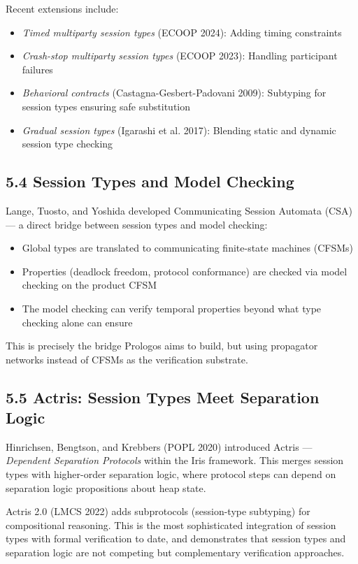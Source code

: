 \documentclass[11pt]{article}
\begin{document}
Recent extensions include:
\begin{itemize}
\item \emph{Timed multiparty session types} (ECOOP 2024): Adding timing constraints
\item \emph{Crash-stop multiparty session types} (ECOOP 2023): Handling participant
failures
\item \emph{Behavioral contracts} (Castagna-Gesbert-Padovani 2009): Subtyping for
session types ensuring safe substitution
\item \emph{Gradual session types} (Igarashi et al. 2017): Blending static and
dynamic session type checking
\end{itemize}
\subsection{5.4 Session Types and Model Checking}
\label{sec:org0774c5a}

Lange, Tuosto, and Yoshida developed Communicating Session Automata (CSA) ---
a direct bridge between session types and model checking:

\begin{itemize}
\item Global types are translated to communicating finite-state machines (CFSMs)
\item Properties (deadlock freedom, protocol conformance) are checked via model
checking on the product CFSM
\item The model checking can verify temporal properties beyond what type checking
alone can ensure
\end{itemize}

This is precisely the bridge Prologos aims to build, but using propagator
networks instead of CFSMs as the verification substrate.
\subsection{5.5 Actris: Session Types Meet Separation Logic}
\label{sec:org6cc348d}

Hinrichsen, Bengtson, and Krebbers (POPL 2020) introduced Actris ---
\emph{Dependent Separation Protocols} within the Iris framework. This merges session
types with higher-order separation logic, where protocol steps can depend on
separation logic propositions about heap state.

Actris 2.0 (LMCS 2022) adds subprotocols (session-type subtyping) for
compositional reasoning. This is the most sophisticated integration of
session types with formal verification to date, and demonstrates that
session types and separation logic are not competing but complementary
verification approaches.
\end{document}
